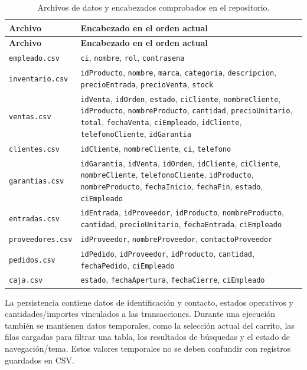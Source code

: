 \begin{longtable}{|p{2.6cm}|p{10cm}|}
\caption{Archivos de datos y encabezados comprobados en el repositorio.}
\label{tab:csv-headers}\\
\hline
\textbf{Archivo} & \textbf{Encabezado en el orden actual}\\
\hline
\endfirsthead
\hline
\textbf{Archivo} & \textbf{Encabezado en el orden actual}\\
\hline
\endhead
\texttt{empleado.csv} & \texttt{ci}, \texttt{nombre}, \texttt{rol}, \texttt{contrasena}\\
\hline
\scriptsize\texttt{inventario.csv} & \texttt{idProducto}, \texttt{nombre}, \texttt{marca}, \texttt{categoria}, \texttt{descripcion}, \texttt{precioEntrada}, \texttt{precioVenta}, \texttt{stock}\\
\hline
\texttt{ventas.csv} & \texttt{idVenta}, \texttt{idOrden}, \texttt{estado}, \texttt{ciCliente}, \texttt{nombreCliente}, \texttt{idProducto}, \texttt{nombreProducto}, \texttt{cantidad}, \texttt{precioUnitario}, \texttt{total}, \texttt{fechaVenta}, \texttt{ciEmpleado}, \texttt{idCliente}, \texttt{telefonoCliente}, \texttt{idGarantia}\\
\hline
\texttt{clientes.csv} & \texttt{idCliente}, \texttt{nombreCliente}, \texttt{ci}, \texttt{telefono}\\
\hline
\scriptsize\texttt{garantias.csv} & \texttt{idGarantia}, \texttt{idVenta}, \texttt{idOrden}, \texttt{idCliente}, \texttt{ciCliente}, \texttt{nombreCliente}, \texttt{telefonoCliente}, \texttt{idProducto}, \texttt{nombreProducto}, \texttt{fechaInicio}, \texttt{fechaFin}, \texttt{estado}, \texttt{ciEmpleado}\\
\hline
\texttt{entradas.csv} & \texttt{idEntrada}, \texttt{idProveedor}, \texttt{idProducto}, \texttt{nombreProducto}, \texttt{cantidad}, \texttt{precioUnitario}, \texttt{fechaEntrada}, \texttt{ciEmpleado}\\
\hline
\scriptsize\texttt{proveedores.csv} & \texttt{idProveedor}, \texttt{nombreProveedor}, \texttt{contactoProveedor}\\
\hline
\texttt{pedidos.csv} & \texttt{idPedido}, \texttt{idProveedor}, \texttt{idProducto}, \texttt{cantidad}, \texttt{fechaPedido}, \texttt{ciEmpleado}\\
\hline
\texttt{caja.csv} & \texttt{estado}, \texttt{fechaApertura}, \texttt{fechaCierre}, \texttt{ciEmpleado}\\
\hline
\end{longtable}

La persistencia contiene datos de identificación y contacto, estados operativos y cantidades/importes vinculados a las transacciones. Durante una ejecución también se mantienen datos temporales, como la selección actual del carrito, las filas cargadas para filtrar una tabla, los resultados de búsquedas y el estado de navegación/tema. Estos valores temporales no se deben confundir con registros guardados en CSV.
